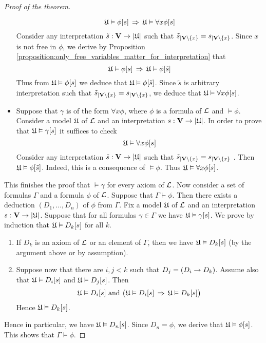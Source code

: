 \begin{proof}[Proof of the theorem]
\begin{itemize}
$${\mathfrak U} \vDash \phi[s] \,\Rightarrow\, {\mathfrak U} \vDash \forall x\phi[s]$$
Consider any interpretation $\tilde{s}:\mathbf{V} \rightarrow |{\mathfrak U}|$ such that $\tilde{s}_{\mid \mathbf{V}\setminus \{x\}} = s_{\mid \mathbf{V}\setminus \{x\}}$. Since $x$ is not free in $\phi$, we derive by Proposition \ref{proposition:only_free_variables_matter_for_interpretation} that
$${\mathfrak U} \vDash \phi[s] \,\Rightarrow\, {\mathfrak U} \vDash \phi[\tilde{s}]$$
Thus from ${\mathfrak U} \vDash \phi[s]$ we deduce that ${\mathfrak U} \vDash \phi[\tilde{s}]$. Since $\tilde{s}$ is arbitrary interpretation such that $\tilde{s}_{\mid \mathbf{V}\setminus \{x\}} = s_{\mid \mathbf{V}\setminus \{x\}}$, we deduce that ${\mathfrak U} \vDash \forall x\phi[s]$.
\item Suppose that $\gamma$ is of the form $\forall x\phi$, where $\phi$ is a formula of ${\mathcal L}$ and $\vDash \phi$. Consider a model ${\mathfrak U}$ of ${\mathcal L}$ and an interpretation $s:\mathbf{V} \rightarrow |{\mathfrak U}|$. In order to prove that ${\mathfrak U} \vDash \gamma[s]$ it suffices to check
$${\mathfrak U} \vDash \forall x\phi[s]$$
Consider any interpretation $\tilde{s}:\mathbf{V} \rightarrow |{\mathfrak U}|$ such that $\tilde{s}_{\mid \mathbf{V}\setminus \{x\}} = s_{\mid \mathbf{V}\setminus \{x\}}$ . Then ${\mathfrak U} \vDash \phi[\tilde{s}]$. Indeed, this is a consequence of $\vDash \phi$. Thus ${\mathfrak U} \vDash \forall  x\phi[s]$.
\end{itemize}
This finishes the proof that $\vDash \gamma$ for every axiom of ${\mathcal L}$. Now consider a set of formulas $\Gamma$ and a formula $\phi$ of ${\mathcal L}$. Suppose that $\Gamma \vdash \phi$. Then there exists a deduction $(D_1, ..., D_n)$ of $\phi$ from $\Gamma$. Fix a model ${\mathfrak U}$ of ${\mathcal L}$ and an interpretation $s:\mathbf{V} \rightarrow |{\mathfrak U}|$. Suppose that for all formulas $\gamma \in \Gamma$ we have ${\mathfrak U} \vDash \gamma[s]$. We prove by induction that ${\mathfrak U} \vDash D_k[s]$ for all $k$.
\begin{enumerate}[label=\textbf{(\arabic*)}, leftmargin=3.0em]
\item If $D_k$ is an axiom of ${\mathcal L}$ or an element of $\Gamma$, then we have ${\mathfrak U} \vDash D_k[s]$ (by the argument above or
by assumption).
\item Suppose now that there are $i, j < k$ such that $D_j = (D_i \rightarrow D_k)$. Assume also that ${\mathfrak U} \vDash D_i[s]$ and ${\mathfrak U} \vDash D_j[s]$. Then
$${\mathfrak U} \vDash D_i[s]\mbox{ and }\big({\mathfrak U} \vDash D_i[s] \,\Rightarrow\, {\mathfrak U} \vDash D_k[s]\big)$$
Hence ${\mathfrak U} \vDash D_k[s]$.
\end{enumerate}
Hence in particular, we have ${\mathfrak U} \vDash D_n[s]$. Since $D_n = \phi$, we derive that ${\mathfrak U} \vDash \phi[s]$. This shows that $\Gamma \vDash \phi$.
\end{proof}

